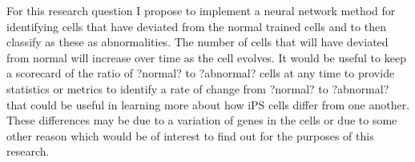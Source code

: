 {For this research question I propose to implement a neural network method for identifying cells that have deviated from the normal trained cells and to then classify as these as abnormalities. The number of cells that will have deviated from normal will increase over time as the cell evolves. It would be useful to keep a scorecard of the ratio of ?normal? to ?abnormal? cells at any time to provide statistics or metrics to identify a rate of change from ?normal? to ?abnormal? that could be useful in learning more about how iPS cells differ from one another. These differences may be due to a variation of genes in the cells or due to some other reason which would be of interest to find out for the purposes of this research. \\ \\
}
